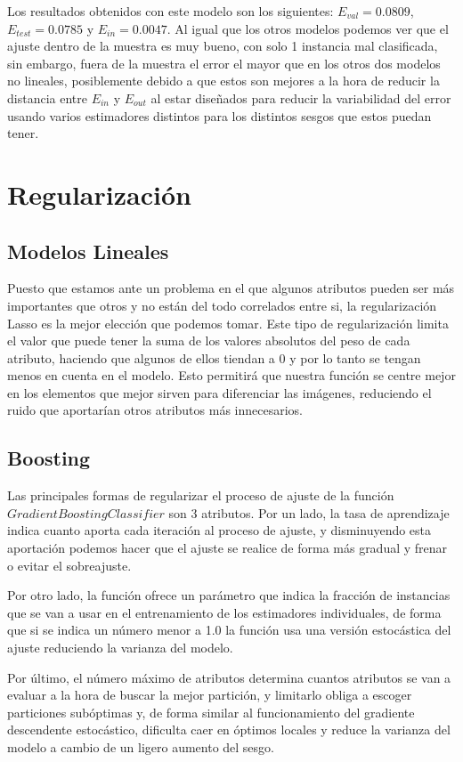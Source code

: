 \documentclass{article}
\begin{document}
	\par 
	Los resultados obtenidos con este modelo son los siguientes: $E_{val} = 0.0809$, $E_{test} = 0.0785$ y $E_{in} = 0.0047$. Al igual que los otros modelos podemos ver que el ajuste dentro de la muestra es muy bueno, con solo 1 instancia mal clasificada, sin embargo, fuera de la muestra el error el mayor que en los otros dos modelos no lineales, posiblemente debido a que estos son mejores a la hora de reducir la distancia entre $E_{in}$ y $E_{out}$ al estar diseñados para reducir la variabilidad del error usando varios estimadores distintos para los distintos sesgos que estos puedan tener.
	
	\section{Regularización}
	
	\subsection{Modelos Lineales}
	Puesto que estamos ante un problema en el que algunos atributos pueden ser más importantes que otros y no están del todo correlados entre si, la regularización Lasso es la mejor elección que podemos tomar. Este tipo de regularización limita el valor que puede tener la suma de los valores absolutos del peso de cada atributo, haciendo que algunos de ellos tiendan a 0 y por lo tanto se tengan menos en cuenta en el modelo. Esto permitirá que nuestra función se centre mejor en los elementos que mejor sirven para diferenciar las imágenes, reduciendo el ruido que aportarían otros atributos más innecesarios.
	\subsection{Boosting}
	Las principales formas de regularizar el proceso de ajuste de la función $GradientBoostingClassifier$ son 3 atributos. Por un lado, la tasa de aprendizaje indica cuanto aporta cada iteración al proceso de ajuste, y disminuyendo esta aportación podemos hacer que el ajuste se realice de forma más gradual y frenar o evitar el sobreajuste. 
	\par 
	Por otro lado, la función ofrece un parámetro que indica la fracción de instancias que se van a usar en el entrenamiento de los estimadores individuales, de forma que si se indica un número menor a 1.0 la función usa una versión estocástica del ajuste reduciendo la varianza del modelo.
	\par 
	Por último, el número máximo de atributos determina cuantos atributos se van a evaluar a la hora de buscar la mejor partición, y limitarlo obliga a escoger particiones subóptimas y, de forma similar al funcionamiento del gradiente descendente estocástico, dificulta caer en óptimos locales y reduce la varianza del modelo a cambio de un ligero aumento del sesgo.
\end{document}
